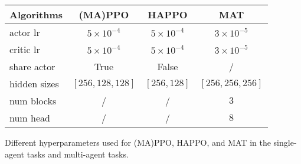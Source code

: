 \begin{tabular}{l | c c c}
    \toprule
    Algorithms & (MA)PPO & HAPPO & MAT \\
    \midrule
        actor lr & $5\times10^{-4}$ & $5\times10^{-4}$ & $3\times10^{-5}$ \\
        critic lr & $5\times10^{-4}$ & $5\times10^{-4}$ & $3\times10^{-5}$  \\
        share actor & True & False & / \\
        hidden sizes & $[256,128,128]$ & $[256,128]$ & $[256,256,256]$ \\
        num blocks & / & / & $3$ \\
        num head & / & / & $8$ \\

    \bottomrule
\end{tabular}
\caption{Different hyperparameters used for (MA)PPO, HAPPO, and MAT in the single-agent tasks and multi-agent tasks.}

